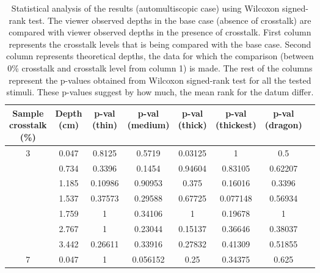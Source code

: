 \begin{table}[H]
  \begin{center}
    \caption{Statistical analysis of the results (automultiscopic case) using Wilcoxon signed-rank test. The viewer observed depths in the base case (absence of crosstalk) are compared with viewer observed depths in the presence of crosstalk. First column  represents the crosstalk levels that is being compared with the base case. Second column represents theoretical depths, the data for which the comparison (between 0\% crosstalk and crosstalk level from column 1) is made. The rest of the columns represent the p-values obtained from Wilcoxon signed-rank test for all the tested stimuli. These p-values suggest by how much, the mean rank for the datum differ.}
    \label{tab:posthoc_auto}
    \begin{tabular}{cccccccc}
      \toprule
      \specialcell{Sample\\crosstalk\\(\%)} & \specialcell{Depth \\(cm)} & \specialcell{p-val \\(thin)} & \specialcell{p-val \\(medium)} & \specialcell{p-val \\(thick)} & \specialcell{p-val \\(thickest)} & \specialcell{p-val \\(dragon)}\\
      \midrule
   3&          0.047&          0.8125&          0.5719&          0.03125&          1&          0.5 \\
    &          0.734&          0.3396&          0.1454&          0.94604&          0.83105&          0.62207 \\
    &          1.185&          0.10986&          0.90953&          0.375&          0.16016&          0.3396 \\
    &          1.537&          0.37573&          0.29588&          0.67725&          0.077148&          0.56934 \\
    &          1.759&          1&          0.34106&          1&          0.19678&          1 \\
    &          2.767&          1&          0.23044&          0.15137&          0.36646&          0.38037 \\
    &          3.442&          0.26611&          0.33916&          0.27832&          0.41309&          0.51855 \\
   7&          0.047&          1&          0.056152&          0.25&          0.34375&          0.625 \\

\end{tabular}
\end{center}
\end{table}
